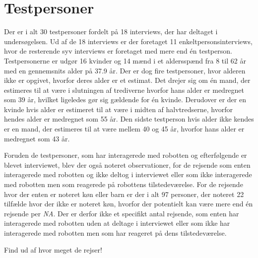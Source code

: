 \section{Testpersoner}
\label{ParametreTestpersoner}
%
Der er i alt 30 testpersoner fordelt på 18 interviews, der har deltaget i undersøgelsen. Ud af de 18 interviews er der foretaget 11 enkeltpersonsinterviews, hvor de resterende syv interviews er foretaget med mere end én testperson. Testpersonerne er udgør 16 kvinder og 14 mænd i et aldersspænd fra 8 til 62 år med en gennemsnits alder på 37.9 år. Der er dog fire testpersoner, hvor alderen ikke er opgivet, hvorfor deres alder er et estimat. Det drejer sig om én mand, der estimeres til at være i slutningen af trediverne hvorfor hans alder er medregnet som 39 år, hvilket ligeledes gør sig gældende for én kvinde. Derudover er der en kvinde hvis alder er estimeret til at være i midten af halvtredserne, hvorfor hendes alder er medregnet som 55 år. Den sidste testperson hvis alder ikke kendes er en mand, der estimeres til at være mellem 40 og 45 år, hvorfor hans alder er medregnet som 43 år. 

Foruden de testpersoner, som har interagerede med robotten og efterfølgende er blevet interviewet, blev der også noteret observationer, for de rejsende som enten interagerede med robotten og ikke deltog i interviewet eller som ikke interagerede med robotten men som reagerede på robottens tilstedeværelse. For de rejsende hvor der enten er noteret køn eller barn er der i alt 97 personer, der noteret 22 tilfælde hvor der ikke er noteret køn, hvorfor der potentielt kan være mere end én rejsende per \textit{NA}. Der er derfor ikke et specifikt antal rejsende, som enten har interagerede med robotten uden at deltage i interviewet eller som ikke har interagerede med robotten men som har reageret på dens tilstedeværelse. \blankline 


Find ud af hvor meget de rejser! 
